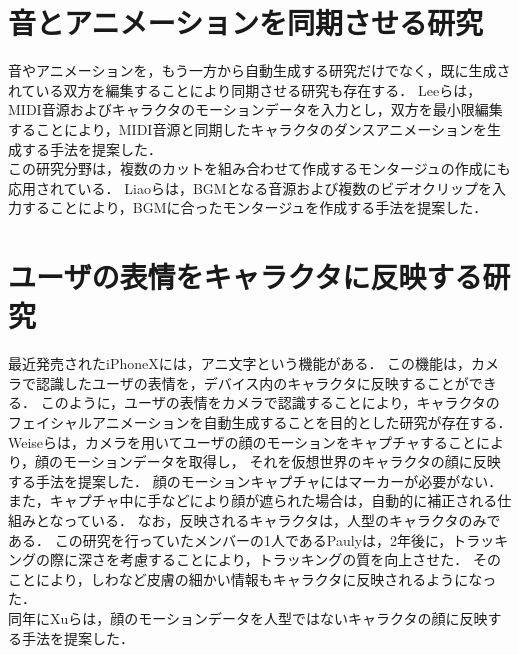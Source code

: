 \section{音とアニメーションを同期させる研究} \label{sec:synchronization}
音やアニメーションを，もう一方から自動生成する研究だけでなく，既に生成されている双方を編集することにより同期させる研究も存在する．
Leeら\cite{Lee}は，MIDI音源およびキャラクタのモーションデータを入力とし，双方を最小限編集することにより，MIDI音源と同期したキャラクタのダンスアニメーションを生成する手法を提案した．\\
\indent
この研究分野は，複数のカットを組み合わせて作成するモンタージュの作成にも応用されている．
Liaoら\cite{Liao}は，BGMとなる音源および複数のビデオクリップを入力することにより，BGMに合ったモンタージュを作成する手法を提案した．

\section{ユーザの表情をキャラクタに反映する研究} \label{sec:animoji}
最近発売されたiPhoneXには，アニ文字という機能がある．
この機能は，カメラで認識したユーザの表情を，デバイス内のキャラクタに反映することができる．
このように，ユーザの表情をカメラで認識することにより，キャラクタのフェイシャルアニメーションを自動生成することを目的とした研究が存在する．\\
\indent
Weiseら\cite{Weise}は，カメラを用いてユーザの顔のモーションをキャプチャすることにより，顔のモーションデータを取得し，
それを仮想世界のキャラクタの顔に反映する手法を提案した．
顔のモーションキャプチャにはマーカーが必要がない．
また，キャプチャ中に手などにより顔が遮られた場合は，自動的に補正される仕組みとなっている．
なお，反映されるキャラクタは，人型のキャラクタのみである．
この研究を行っていたメンバーの1人であるPauly\cite{Pauly}は，2年後に，トラッキングの際に深さを考慮することにより，トラッキングの質を向上させた．
そのことにより，しわなど皮膚の細かい情報もキャラクタに反映されるようになった．\\
\indent
同年にXuら\cite{Xu}は，顔のモーションデータを人型ではないキャラクタの顔に反映する手法を提案した．

